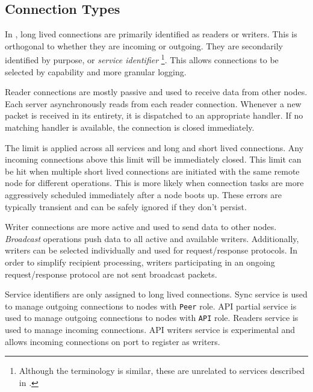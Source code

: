 \subsection{Connection Types}

In \codename, long lived connections are primarily identified as readers or writers.
This is orthogonal to whether they are incoming or outgoing.
They are secondarily identified by purpose, or \emph{service identifier}
\footnote{Although the terminology is similar, these are unrelated to services described in .}.
This allows connections to be selected by capability and more granular logging.

Reader connections are mostly passive and used to receive data from other nodes.
Each server asynchronously reads from each reader connection.
Whenever a new packet is received in its entirety, it is dispatched to an appropriate handler.
If no matching handler is available, the connection is closed immediately.

The  limit is applied across all services and long and short lived connections.
Any incoming connections above this limit will be immediately closed.
This limit can be hit when multiple short lived connections are initiated with the same remote node for different operations.
This is more likely when connection tasks are more aggressively scheduled immediately after a node boots up.
These errors are typically transient and can be safely ignored if they don't persist.

Writer connections are more active and used to send data to other nodes.
\emph{Broadcast} operations push data to all active and available writers.
Additionally, writers can be selected individually and used for request/response protocols.
In order to simplify recipient processing, writers participating in an ongoing request/response protocol are not sent broadcast packets.

Service identifiers are only assigned to long lived connections.
Sync service is used to manage outgoing connections to nodes with \texttt{Peer} role.
API partial service is used to manage outgoing connections to nodes with \texttt{API} role.
Readers service is used to manage incoming connections.
API writers service is experimental and allows incoming connections on port  to register as writers.

\begin{figure}[H]
	\label{tbl:network:serviceIdentifiers}
\end{figure}

